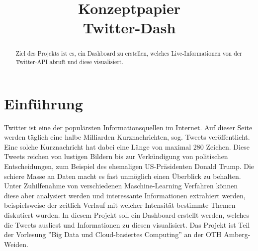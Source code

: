 \documentclass[conference]{IEEEtran}
\begin{document}
\title{Konzeptpapier\\Twitter-Dash}

\author{
        \and

        \and

        \and

        \and

        \and

}

\maketitle

\begin{abstract}
        Ziel des Projekts ist es, ein Dashboard zu erstellen, welches Live-Informationen von der Twitter-API abruft und diese visualisiert.
\end{abstract}


\section{Einführung}

Twitter ist eine der populärsten Informationsquellen im Internet.
Auf dieser Seite werden täglich eine halbe Milliarden Kurznachrichten\cite{Tweetstatistiken}, sog. Tweets veröffentlicht.
Eine solche Kurznachricht hat dabei eine Länge von maximal 280 Zeichen.
Diese Tweets reichen von lustigen Bildern bis zur Verkündigung von politischen Entscheidungen, zum Beispiel des ehemaligen US-Präsidenten Donald Trump.
Die schiere Masse an Daten macht es fast unmöglich einen Überblick zu behalten.
Unter Zuhilfenahme von verschiedenen Maschine-Learning Verfahren können diese aber analysiert werden und interessante Informationen extrahiert werden, beispielsweise der zeitlich Verlauf mit welcher Intensität bestimmte Themen diskutiert wurden.
In diesem Projekt soll ein Dashboard erstellt werden, welches die Tweets ausliest und Informationen zu diesen visualisiert.
Das Projekt ist Teil der Vorlesung ”Big Data und Cloud-basiertes Computing” an der OTH Amberg-Weiden.
\end{document}
